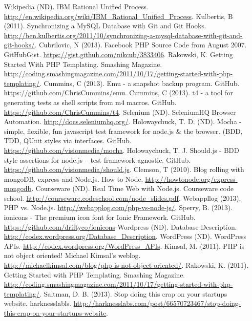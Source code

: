 \newpage
\begin{thebibliography}{9}
 Wikipedia (ND). IBM Rational Unified Process.
  \url{http://en.wikipedia.org/wiki/IBM\_Rational\_Unified\_Process}.
 Kulbertis, B (2011). Synchronizing a MySQL Database with
  Git and Git
  Hooks. \url{http://ben.kulbertis.org/2011/10/synchronizing-a-mysql-database-with-git-and-git-hooks/}.
 Cubrilovic, N (2013). Facebook PHP Source Code from
  August 2007. GitHubGist. \url{https://gist.github.com/nikcub/3833406}.
 Rakowski, K. Getting Started With PHP
  Templating. Smashing
  Magazine. \url{http://coding.smashingmagazine.com/2011/10/17/getting-started-with-php-templating/}.
 Cummins, C (2013). Emu - a snapshot backup
  program. GitHub. \url{https://github.com/ChrisCummins/emu}.
 Cummins, C (2013). t4 - a tool for generating tests as
shell scripts from m4 macros. GitHub. \url{https://github.com/ChrisCummins/t4}.
 Selenium (ND). SeleniumHQ Browser
Automation. \url{http://docs.seleniumhq.org/}.
 Holowaychuck, T. D. (ND). Mocha - simple, flexible, fun
javascript test framework for node.js \& the browser. (BDD, TDD, QUnit styles
via interfaces. GitHub. \url{https://github.com/visionmedia/mocha}.
 Holowaychuck, T. J. Should.js - BDD style assertions
for node.js -- test framework
agnostic. GitHub. \url{https://github.com/visionmedia/should.js}.
 Clemson, T (2010). Blog rolling with mongoDB, express and
Node.js. How to Node. \url{http://howtonode.org/express-mongodb}.
 Courseware (ND). Real Time Web with Node.js. Courseware
code school. \url{http://courseware.codeschool.com/node_slides.pdf}.
 Webappllog (2013). PHP
vs. Node.js. \url{http://webapplog.com/php-vs-node-js/}.
 Sperry, B. (2013). ionicons - The premium icon font for
Ionic Framework. GitHub. \url{https://github.com/driftyco/ionicons}
 Wordpress (ND). Database
Description. \url{http://codex.wordpress.org/Database_Description}.
 WordPress (ND). WordPress
APIs. \url{http://codex.wordpress.org/WordPress_APIs}.
 Kimsal, M. (2011). PHP is not object oriented! Michael Kimsal's
weblog. \url{http://michaelkimsal.com/blog/php-is-not-object-oriented/}.
 Rakowski, K. (2011). Getting Started with PHP
Templating. Smashing Magazine.
\url{http://coding.smashingmagazine.com/2011/10/17/getting-started-with-php-templating/}.
 Saltman, D. B. (2013). Stop doing this crap on your
startups website. harknesslabls.
\url{http://harknesslabs.com/post/66570723467/stop-doing-this-crap-on-your-startups-website}.
\end{thebibliography}
